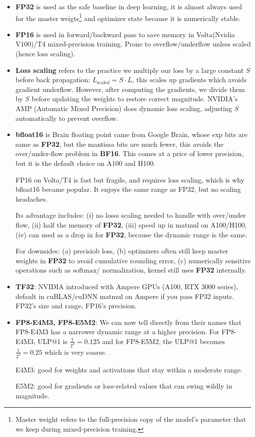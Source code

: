 \documentclass[11pt]{article}  %
\begin{document}
\begin{itemize}
  \item \textbf{FP32} is used as the safe baseline in deep learning, it is almost always used for the master weigts\footnote{Master weight refers to the full-precision copy of the model's parameter that we keep during mixed-precision training.} and optimizer state because it is numerically stable.
  
  \item \textbf{FP16} is used in forward/backward pass to save memory in Volta(Nvidia V100)/T4 mixed-precision training. Prone to overflow/underflow unless scaled (hence loss scaling).
  
  \item \textbf{Loss scaling} refers to the practice we multiply our loss by a large constant $S$ before back propagation: $L_{\text{scaled}} = S \cdot L$, this scales up gradients which avoids gradient underflow. 
  However, after computing the gradients, we divide them by $S$ before updating the weights to restore correct magnitude. 
  NVIDIA's AMP (Automatic Mixed Precision) does dynamic loss scaling, adjusting $S$ automatically to prevent overflow. 

  \item \textbf{bfloat16} is Brain floating point came from Google Brain, whose exp bits are same as \textbf{FP32}, but the mantissa bits are much fewer, this avoids the over/under-flow problem in \textbf{BF16}. 
  This comes at a price of lower precision, but it is the default choice on A100 and H100.

  FP16 on Volta/T4 is fast but fragile, and requires loss scaling, which is why bfloat16 became popular. 
  It enjoys the same range as FP32, but no scaling headaches.

  Its advantage includes: (i) no losss scaling needed to handle with over/under flow, (ii) half the memory of \textbf{FP32}, (iii) speed up in matmul on A100/H100, (iv) can used as a drop in for \textbf{FP32}, because the dynamic range is the same.

  For downsides: (a) precisiob loss, (b) optimizers often still keep master weights in \textbf{FP32} to avoid cumulative rounding error, (c) numerically sensitive operations such as $\text{softmax}$/ normalization, kernel still uses \textbf{FP32} internally.

  \item \textbf{TF32}: NVIDIA introduced with Ampere GPUs (A100, RTX 3000 series), default in cuBLAS/cuDNN matmul on Ampere if you pass FP32 inputs. FP32's size and range, FP16's precision.
  
  \item \textbf{FP8-E4M3, FP8-E5M2}: We can now tell directly from their names that FP8-E4M3 has a narrower dynamic range at a higher precision. For FP8-E4M3, ULP@1 is $\frac{1}{2^3} = 0.125$ and for FP8-E5M2, the ULP@1 becomes $\frac{1}{2^2} = 0.25$ which is very coarse.
  
  E4M3: good for weights and activations that stay within a moderate range.

  E5M2: good for gradients or loss-related values that can swing wildly in magnitude.
\end{itemize}
\end{document}
